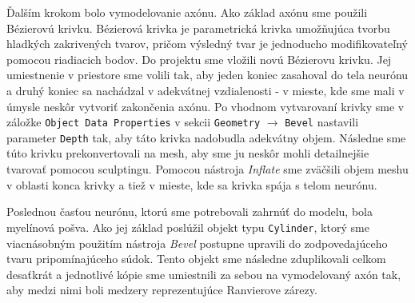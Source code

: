 Ďalším krokom bolo vymodelovanie axónu. Ako základ axónu sme použili Bézierovú krivku. Bézierová krivka je parametrická krivka umožňujúca tvorbu hladkých zakrivených tvarov, pričom výsledný tvar je
jednoducho modifikovateľný pomocou riadiacich bodov. Do projektu sme vložili novú Bézierovu krivku. Jej umiestnenie v priestore sme volili tak, aby jeden koniec zasahoval do tela neurónu 
a druhý koniec sa nachádzal v adekvátnej vzdialenosti - v mieste, kde sme mali v úmysle neskôr vytvoriť zakončenia axónu. Po vhodnom vytvarovaní krivky sme v záložke \texttt{Object Data Properties}
v sekcii \texttt{Geometry} $\rightarrow$ \texttt{Bevel} nastavili parameter \texttt{Depth} tak, aby táto krivka nadobudla adekvátny objem. Následne sme túto krivku prekonvertovali na mesh, aby 
sme ju neskôr mohli detailnejšie tvarovať pomocou sculptingu. 
Pomocou nástroja \emph{Inflate} sme zväčšili objem meshu v oblasti konca krivky a tiež v mieste, kde sa krivka spája s telom neurónu. 

Poslednou časťou neurónu, ktorú sme potrebovali zahrnúť do modelu, bola myelínová pošva. Ako jej základ poslúžil objekt typu \texttt{Cylinder}, ktorý sme viacnásobným použitím nástroja \emph{Bevel} postupne
upravili do zodpovedajúceho tvaru pripomínajúceho súdok. Tento objekt sme následne zduplikovali celkom desaťkrát a jednotlivé kópie sme umiestnili za sebou na vymodelovaný axón tak, aby medzi 
nimi boli medzery reprezentujúce Ranvierove zárezy.